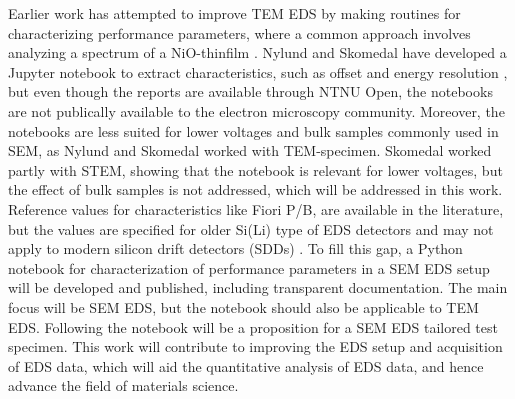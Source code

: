 

Earlier work has attempted to improve TEM EDS by making routines for characterizing performance parameters, where a common approach involves analyzing a spectrum of a NiO-thinfilm \cite{egerton_nio_characterization_1994,ted_pella_nio_tem_2019}.
Nylund \cite{nylund_evaluation_2017} and Skomedal \cite{skomedal_improving_2022} have developed a Jupyter notebook to extract characteristics, such as offset and energy resolution , but even though the reports are available through NTNU Open, the notebooks are not publically available to the electron microscopy community.
Moreover, the notebooks are less suited for lower voltages and bulk samples commonly used in SEM, as Nylund and Skomedal worked with TEM-specimen.
Skomedal worked partly with STEM, showing that the notebook is relevant for lower voltages, but the effect of bulk samples is not addressed, which will be addressed in this work.
Reference values for characteristics like Fiori P/B,  are available in the literature, but the values are specified for older Si(Li) type of EDS detectors and may not apply to modern silicon drift detectors (SDDs) \cite{sdd_lechner_2001}.
To fill this gap, a Python notebook for characterization of performance parameters in a SEM EDS setup will be developed and published, including transparent documentation.
The main focus will be SEM EDS, but the notebook should also be applicable to TEM EDS.
Following the notebook will be a proposition for a SEM EDS tailored test specimen.
This work will contribute to improving the EDS setup and acquisition of EDS data, which will aid the quantitative analysis of EDS data, and hence advance the field of materials science.



